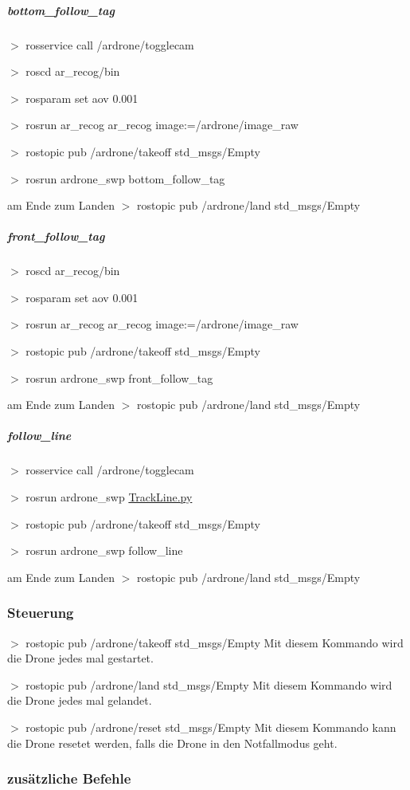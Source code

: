 \subparagraph*{bottom\_\-follow\_\-tag }

$>$ rosservice call /ardrone/togglecam

$>$ roscd ar\_\-recog/bin

$>$ rosparam set aov 0.001

$>$ rosrun ar\_\-recog ar\_\-recog image:=/ardrone/image\_\-raw

$>$ rostopic pub /ardrone/takeoff std\_\-msgs/Empty

$>$ rosrun ardrone\_\-swp bottom\_\-follow\_\-tag

am Ende zum Landen $>$ rostopic pub /ardrone/land std\_\-msgs/Empty

\subparagraph*{front\_\-follow\_\-tag }

$>$ roscd ar\_\-recog/bin

$>$ rosparam set aov 0.001

$>$ rosrun ar\_\-recog ar\_\-recog image:=/ardrone/image\_\-raw

$>$ rostopic pub /ardrone/takeoff std\_\-msgs/Empty

$>$ rosrun ardrone\_\-swp front\_\-follow\_\-tag

am Ende zum Landen $>$ rostopic pub /ardrone/land std\_\-msgs/Empty

\subparagraph*{follow\_\-line }

$>$ rosservice call /ardrone/togglecam

$>$ rosrun ardrone\_\-swp \hyperlink{_track_line_8py}{TrackLine.py}

$>$ rostopic pub /ardrone/takeoff std\_\-msgs/Empty

$>$ rosrun ardrone\_\-swp follow\_\-line

am Ende zum Landen $>$ rostopic pub /ardrone/land std\_\-msgs/Empty

\subsubsection*{Steuerung }

$>$ rostopic pub /ardrone/takeoff std\_\-msgs/Empty Mit diesem Kommando wird die Drone jedes mal gestartet.

$>$ rostopic pub /ardrone/land std\_\-msgs/Empty Mit diesem Kommando wird die Drone jedes mal gelandet.

$>$ rostopic pub /ardrone/reset std\_\-msgs/Empty Mit diesem Kommando kann die Drone resetet werden, falls die Drone in den Notfallmodus geht.

\subsubsection*{zusätzliche Befehle }

